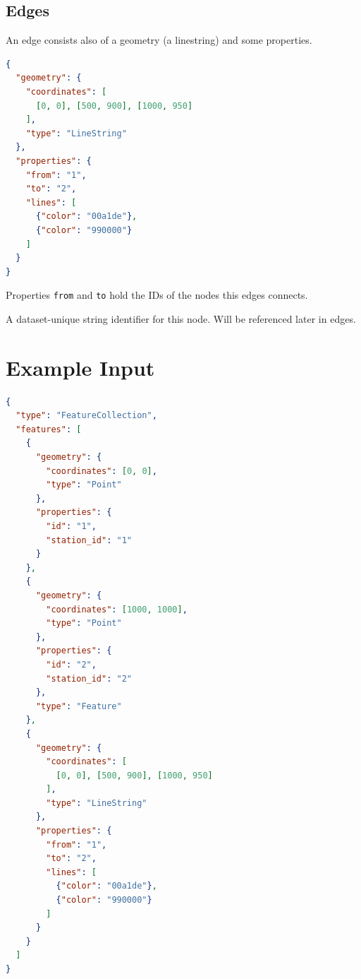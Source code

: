 \documentclass[10pt,a4paper]{article}
\begin{document}
\subsection{Edges}

An edge consists also of a geometry (a linestring) and some properties.

\begin{lstlisting}[language=json,firstnumber=1]
{
  "geometry": {
	"coordinates": [
	  [0, 0], [500, 900], [1000, 950]
	],
	"type": "LineString"
  },
  "properties": {
	"from": "1",
	"to": "2",
	"lines": [
	  {"color": "00a1de"},
	  {"color": "990000"}
	]
  }
}
\end{lstlisting}

Properties \texttt{from} and \texttt{to} hold the IDs of the nodes this edges connects. 

\begin{description}[align=right]
  \item[\texttt{id}] A dataset-unique string identifier for this node. Will be referenced later in edges.

\end{description}
\section{Example Input}


\begin{lstlisting}[language=json,firstnumber=1]
{
  "type": "FeatureCollection",
  "features": [
    {
      "geometry": {
        "coordinates": [0, 0],
        "type": "Point"
      },
      "properties": {
        "id": "1",
        "station_id": "1"
      }
    },
    {
      "geometry": {
        "coordinates": [1000, 1000],
        "type": "Point"
      },
      "properties": {
        "id": "2",
        "station_id": "2"
      },
      "type": "Feature"
    },
    {
      "geometry": {
        "coordinates": [
          [0, 0], [500, 900], [1000, 950]
        ],
        "type": "LineString"
      },
      "properties": {
        "from": "1",
        "to": "2",
        "lines": [
          {"color": "00a1de"},
          {"color": "990000"}
        ]
      }
    }
  ]
}
\end{lstlisting}
\end{document}
